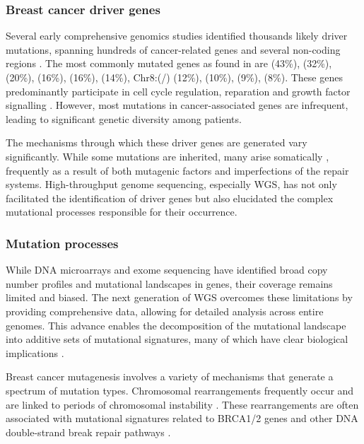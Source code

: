 \subsubsection*{Breast cancer driver genes}
Several early comprehensive genomics studies identified thousands likely driver mutations, spanning hundreds of cancer-related genes and several non-coding regions \parencite{Shah2009-xz, Cancer_Genome_Atlas_Network2012-gx,Shah2012-xz, Nik-Zainal2016-ek,Banerji2012-as,Ciriello2015-ey,Pereira2016-ov, Curtis2012-hu}. The most commonly mutated genes as found in \textcite{Cancer_Genome_Atlas_Network2012-gx} are  (43\%),  (32\%),  (20\%),  (16\%),  (16\%),  (14\%), Chr8:(/) (12\%),  (10\%),  (9\%),  (8\%). These genes predominantly participate in cell cycle regulation, reparation and growth factor signalling . However, most mutations in cancer-associated genes are infrequent, leading to significant genetic diversity among patients. 

The mechanisms through which these driver genes are generated vary significantly. While some mutations are inherited, many arise somatically , frequently as a result of both mutagenic factors and imperfections of the repair systems. High-throughput genome sequencing, especially \ac{WGS}, has not only facilitated the identification of driver genes but also elucidated the complex mutational processes responsible for their occurrence.

\subsubsection*{Mutation processes}

While DNA microarrays and exome sequencing have identified broad copy number profiles and mutational landscapes in genes, their coverage remains limited and biased. The next generation of \ac{WGS} overcomes these limitations by providing comprehensive data, allowing for detailed analysis across entire genomes. This advance enables the decomposition of the mutational landscape into additive sets of mutational signatures, many of which have clear biological implications \parencite{Nik-Zainal2012-vo}. 

Breast cancer mutagenesis involves a variety of mechanisms that generate a spectrum of mutation types. Chromosomal rearrangements frequently occur and are linked to periods of chromosomal instability \parencite{Curtis2012-hu, Gerstung2020-sg, Nik-Zainal2012-vo}. These rearrangements are often associated with mutational signatures related to BRCA1/2 genes and other DNA double-strand break repair pathways \parencite{Nik-Zainal2012-vo}.

